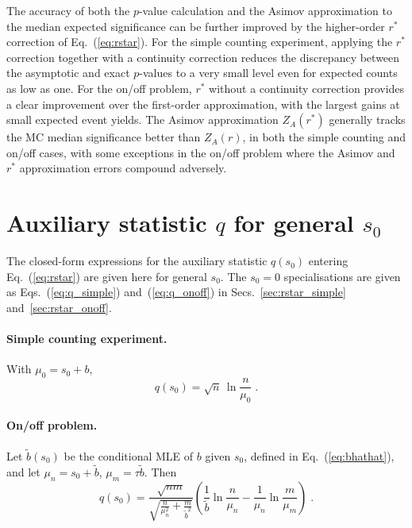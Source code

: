 \documentclass[11pt]{article}
\begin{document}
The accuracy of both the $p$-value calculation and the Asimov
approximation to the median expected significance can be further
improved by the higher-order $r^*$ correction of
Eq.~(\ref{eq:rstar}).  For the simple counting experiment, applying
the $r^*$ correction together with a continuity correction reduces the
discrepancy between the asymptotic and exact $p$-values to a very
small level even for expected counts as low as one.  For the on/off
problem, $r^*$ without a continuity correction provides a clear
improvement over the first-order approximation, with the largest gains
at small expected event yields.  The Asimov approximation $Z_A(r^*)$ generally tracks the MC median
significance better than $Z_A(r)$, in both the simple counting and
on/off cases, with some exceptions in the on/off problem where the
Asimov and $r^*$ approximation errors compound adversely.


\appendix

\section{Auxiliary statistic $q$ for general $s_0$}
\label{app:q}

The closed-form expressions for the auxiliary statistic $q(s_0)$
entering Eq.~(\ref{eq:rstar}) are given here for general $s_0$.
The $s_0 = 0$ specialisations are given as
Eqs.~(\ref{eq:q_simple}) and~(\ref{eq:q_onoff}) in
Secs.~\ref{sec:rstar_simple} and~\ref{sec:rstar_onoff}.

\paragraph{Simple counting experiment.}
With $\mu_0 = s_0 + b$,
%
\begin{equation}
  \label{eq:q_simple_gen}
  q(s_0) = \sqrt{n}\,\ln\!\frac{n}{\mu_0} \;.
\end{equation}

\paragraph{On/off problem.}
Let $\tilde{b}(s_0)$ be the conditional MLE of $b$ given $s_0$, defined in
Eq.~(\ref{eq:bhathat}), and let $\mu_n = s_0 + \tilde{b}$,
$\mu_m = \tau\tilde{b}$.  Then
%
\begin{equation}
  \label{eq:q_onoff_gen}
  q(s_0) = \frac{\sqrt{nm}}{\displaystyle\sqrt{\frac{n}{\mu_n^2} +
      \frac{m}{\tilde{b}^2}}}
  \left(\frac{1}{\tilde{b}}\ln\frac{n}{\mu_n} -
    \frac{1}{\mu_n}\ln\frac{m}{\mu_m}\right) \;.
\end{equation}
\end{document}
